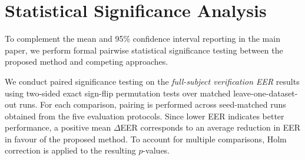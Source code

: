 \documentclass[10pt,journal,compsoc]{IEEEtran}
\begin{document}





\maketitle


\IEEEdisplaynontitleabstractindextext
\IEEEpeerreviewmaketitle


\section{Statistical Significance Analysis}
\label{sec:statistical_significance}

To complement the mean and 95\% confidence interval reporting in the main paper, we perform formal pairwise statistical significance testing between the proposed method and competing approaches.

We conduct paired significance testing on the \emph{full-subject verification EER} results using two-sided exact sign-flip permutation tests over matched leave-one-dataset-out runs. For each comparison, pairing is performed across seed-matched runs obtained from the five evaluation protocols. Since lower EER indicates better performance, a positive mean $\Delta$EER corresponds to an average reduction in EER in favour of the proposed method.
To account for multiple comparisons, Holm correction is applied to the resulting $p$-values.
\end{document}
